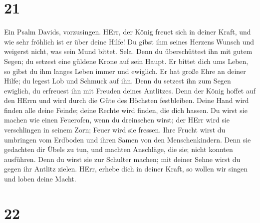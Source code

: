 \hypertarget{section-20}{%
\section{21}\label{section-20}}

 Ein Psalm Davids, vorzusingen.  HErr, der König
freuet sich in deiner Kraft, und wie sehr fröhlich ist er über deine
Hilfe!  Du gibst ihm seines Herzens Wunsch und weigerst
nicht, was sein Mund bittet. Sela.  Denn du überschüttest
ihn mit gutem Segen; du setzest eine güldene Krone auf sein Haupt.
 Er bittet dich ums Leben, so gibst du ihm langes Leben
immer und ewiglich.  Er hat große Ehre an deiner Hilfe; du
legest Lob und Schmuck auf ihn.  Denn du setzest ihn zum
Segen ewiglich, du erfreuest ihn mit Freuden deines Antlitzes.
 Denn der König hoffet auf den HErrn und wird durch die Güte
des Höchsten festbleiben.  Deine Hand wird finden alle deine
Feinde; deine Rechte wird finden, die dich hassen.  Du
wirst sie machen wie einen Feuerofen, wenn du dreinsehen wirst; der HErr
wird sie verschlingen in seinem Zorn; Feuer wird sie fressen.
 Ihre Frucht wirst du umbringen vom Erdboden und ihren
Samen von den Menschenkindern.  Denn sie gedachten dir
Übels zu tun, und machten Anschläge, die sie; nicht konnten ausführen.
 Denn du wirst sie zur Schulter machen; mit deiner Sehne
wirst du gegen ihr Antlitz zielen.  HErr, erhebe dich in
deiner Kraft, so wollen wir singen und loben deine Macht.

\hypertarget{section-21}{%
\section{22}\label{section-21}}

